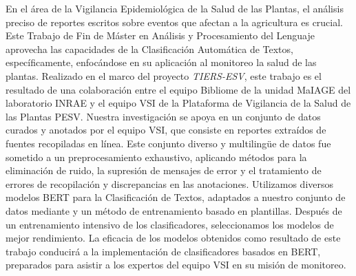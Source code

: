En el \'area de la Vigilancia Epidemiol\'ogica de la Salud de las Plantas, el an\'alisis preciso de reportes escritos sobre eventos que afectan a la agricultura es crucial. Este Trabajo de Fin de M\'aster en An\'alisis y Procesamiento del Lenguaje aprovecha las capacidades de la Clasificaci\'on Autom\'atica de Textos, espec\'ificamente, enfoc\'andose en su aplicaci\'on al monitoreo la salud de las plantas. Realizado en el marco del proyecto \emph{TIERS-ESV}, este trabajo es el resultado de una colaboración entre el equipo Bibliome de la unidad MaIAGE del laboratorio INRAE y el equipo VSI de la Plataforma de Vigilancia de la Salud de las Plantas PESV. Nuestra investigaci\'on se apoya en un conjunto de datos curados y anotados por el equipo VSI, que consiste en reportes extra\'idos de fuentes recopiladas en l\'inea. Este conjunto diverso y multiling\"ue de datos fue sometido a un preprocesamiento exhaustivo, aplicando m\'etodos para la eliminación de ruido, la supresi\'on de mensajes de error y el tratamiento de errores de recopilaci\'on y discrepancias en las anotaciones. Utilizamos diversos modelos BERT para la Clasificación de Textos, adaptados a nuestro conjunto de datos mediante \finetuning{} y un m\'etodo de entrenamiento basado en plantillas. Despu\'es de un entrenamiento intensivo de los clasificadores, seleccionamos los modelos de mejor rendimiento. La eficacia de los modelos obtenidos como resultado de este trabajo conducir\'a a la implementaci\'on de clasificadores basados en BERT, preparados para asistir a los expertos del equipo VSI en su misi\'on de monitoreo.